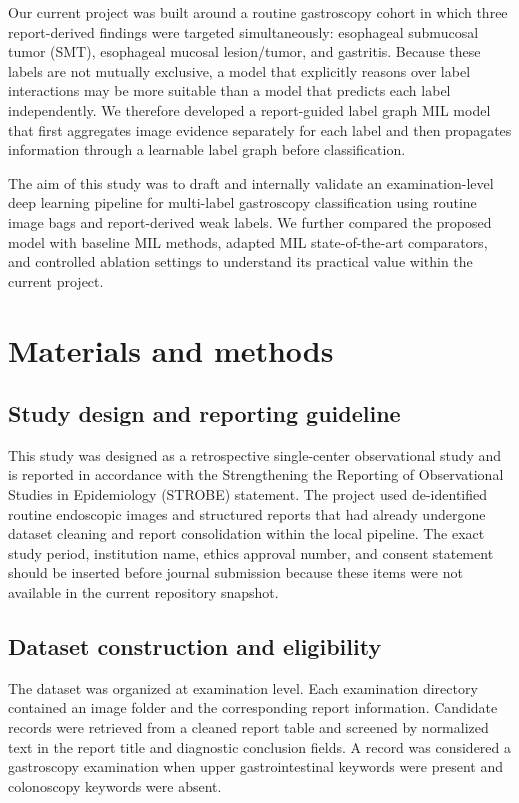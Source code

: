 \documentclass[Afour,sagev,times]{sagej}
\begin{document}
Our current project was built around a routine gastroscopy cohort in which three report-derived findings were targeted simultaneously: esophageal submucosal tumor (SMT), esophageal mucosal lesion/tumor, and gastritis. Because these labels are not mutually exclusive, a model that explicitly reasons over label interactions may be more suitable than a model that predicts each label independently. We therefore developed a report-guided label graph MIL model that first aggregates image evidence separately for each label and then propagates information through a learnable label graph before classification.

The aim of this study was to draft and internally validate an examination-level deep learning pipeline for multi-label gastroscopy classification using routine image bags and report-derived weak labels. We further compared the proposed model with baseline MIL methods, adapted MIL state-of-the-art comparators, and controlled ablation settings to understand its practical value within the current project.

\section{Materials and methods}
\subsection{Study design and reporting guideline}
This study was designed as a retrospective single-center observational study and is reported in accordance with the Strengthening the Reporting of Observational Studies in Epidemiology (STROBE) statement.\cite{R9} The project used de-identified routine endoscopic images and structured reports that had already undergone dataset cleaning and report consolidation within the local pipeline. The exact study period, institution name, ethics approval number, and consent statement should be inserted before journal submission because these items were not available in the current repository snapshot.

\subsection{Dataset construction and eligibility}
The dataset was organized at examination level. Each examination directory contained an image folder and the corresponding report information. Candidate records were retrieved from a cleaned report table and screened by normalized text in the report title and diagnostic conclusion fields. A record was considered a gastroscopy examination when upper gastrointestinal keywords were present and colonoscopy keywords were absent.
\end{document}
